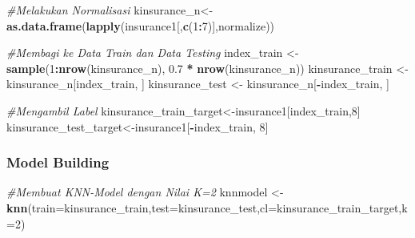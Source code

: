 \documentclass[]{article}
\newenvironment{Shaded}{\begin{snugshade}}{\end{snugshade}}
\newcommand{\CommentTok}[1]{\textcolor[rgb]{0.56,0.35,0.01}{\textit{#1}}}
\newcommand{\DataTypeTok}[1]{\textcolor[rgb]{0.13,0.29,0.53}{#1}}
\newcommand{\DecValTok}[1]{\textcolor[rgb]{0.00,0.00,0.81}{#1}}
\newcommand{\FloatTok}[1]{\textcolor[rgb]{0.00,0.00,0.81}{#1}}
\newcommand{\KeywordTok}[1]{\textcolor[rgb]{0.13,0.29,0.53}{\textbf{#1}}}
\newcommand{\NormalTok}[1]{#1}
\newcommand{\OperatorTok}[1]{\textcolor[rgb]{0.81,0.36,0.00}{\textbf{#1}}}
\newcommand{\StringTok}[1]{\textcolor[rgb]{0.31,0.60,0.02}{#1}}
\begin{document}
\begin{Shaded}
\begin{Highlighting}[]
\CommentTok{#Melakukan Normalisasi}
\NormalTok{kinsurance_n<-}\KeywordTok{as.data.frame}\NormalTok{(}\KeywordTok{lapply}\NormalTok{(insurance1[,}\KeywordTok{c}\NormalTok{(}\DecValTok{1}\OperatorTok{:}\DecValTok{7}\NormalTok{)],normalize))}
\end{Highlighting}
\end{Shaded}

\begin{Shaded}
\begin{Highlighting}[]
\CommentTok{#Membagi ke Data Train dan Data Testing}
\NormalTok{index_train <-}\StringTok{ }\KeywordTok{sample}\NormalTok{(}\DecValTok{1}\OperatorTok{:}\KeywordTok{nrow}\NormalTok{(kinsurance_n), }\FloatTok{0.7} \OperatorTok{*}\StringTok{ }\KeywordTok{nrow}\NormalTok{(kinsurance_n))}
\NormalTok{kinsurance_train <-}\StringTok{ }\NormalTok{kinsurance_n[index_train, ]}
\NormalTok{kinsurance_test <-}\StringTok{ }\NormalTok{kinsurance_n[}\OperatorTok{-}\NormalTok{index_train, ]}
\end{Highlighting}
\end{Shaded}

\begin{Shaded}
\begin{Highlighting}[]
\CommentTok{#Mengambil Label}
\NormalTok{kinsurance_train_target<-insurance1[index_train,}\DecValTok{8}\NormalTok{]}
\NormalTok{kinsurance_test_target<-insurance1[}\OperatorTok{-}\NormalTok{index_train, }\DecValTok{8}\NormalTok{]}
\end{Highlighting}
\end{Shaded}

\hypertarget{model-building-2}{%
\subsubsection{Model Building}\label{model-building-2}}

\begin{Shaded}
\begin{Highlighting}[]
\CommentTok{#Membuat KNN-Model dengan Nilai K=2}
\NormalTok{knnmodel <-}\KeywordTok{knn}\NormalTok{(}\DataTypeTok{train=}\NormalTok{kinsurance_train,}\DataTypeTok{test=}\NormalTok{kinsurance_test,}\DataTypeTok{cl=}\NormalTok{kinsurance_train_target,}\DataTypeTok{k=}\DecValTok{2}\NormalTok{)}
\end{Highlighting}
\end{Shaded}
\end{document}
